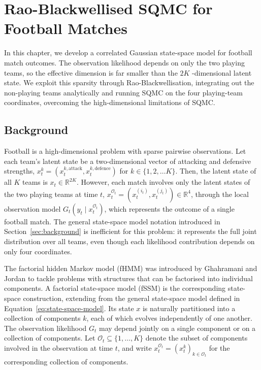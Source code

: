 \chapter{Rao-Blackwellised SQMC for Football Matches}
\label{ch:model}
In this chapter, we develop a correlated Gaussian state-space model for football match outcomes. The observation likelihood depends on only the two playing teams, so the effective dimension is far smaller than the $2K$ -dimensional latent state. We exploit this sparsity through Rao-Blackwellisation, integrating out the non-playing teams analytically and running SQMC on the four playing-team coordinates, overcoming the high-dimensional limitations of SQMC.

\section{Background}
\label{sec:rb-sqmc-background}
Football is a high-dimensional problem with sparse pairwise observations. Let each team's latent state be a two-dimensional vector of attacking and defensive strengths, $x_t^k = (x_t^{k, \text{attack}}, x_t^{k, \text{defence}})$ for $k \in \{1, 2, \ldots K\}$. Then, the latent state of all $K$ teams is $x_t \in \mathbb{R}^{2K}$. However, each match involves only the latent states of the two playing teams at time $t$, $x_t^{\mathcal{O}_t} = (x_t^{(i_t)}, x_t^{(j_t)}) \in \mathbb{R}^4$, through the local observation model $G_t(y_t \mid x_t^{\mathcal{O}_t})$, which represents the outcome of a single football match. The general state-space model notation introduced in Section~\ref{sec:background} is inefficient for this problem: it represents the full joint distribution over all teams, even though each likelihood contribution depends on only four coordinates.

The factorial hidden Markov model (fHMM) was introduced by Ghahramani and Jordan \citep{ghahramanijordan1995factorialhmm,ghahramanijordan1997factorialhmm} to tackle problems with structures that can be factorised into individual components. A factorial state-space model (fSSM) is the corresponding state-space construction, extending from the general state-space model defined in Equation~\eqref{eq:state-space-model}. Its state $x$ is naturally partitioned into a collection of components $k$, each of which evolves independently of one another. The observation likelihood $G_t$ may depend jointly on a single component or on a collection of components. Let $\mathcal{O}_t \subseteq \{1,\ldots,K\}$ denote the subset of components involved in the observation at time $t$, and write $x_t^{\mathcal{O}_t} = (x_t^k)_{k \in \mathcal{O}_t}$ for the corresponding collection of components.

